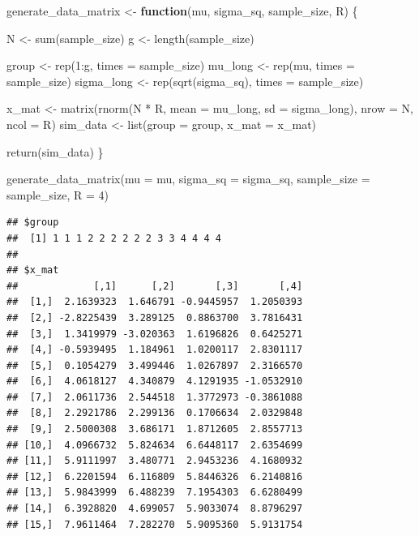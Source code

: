 \documentclass[
]{book}
\newenvironment{Shaded}{\begin{snugshade}}{\end{snugshade}}
\newcommand{\AttributeTok}[1]{\textcolor[rgb]{0.77,0.63,0.00}{#1}}
\newcommand{\ControlFlowTok}[1]{\textcolor[rgb]{0.13,0.29,0.53}{\textbf{#1}}}
\newcommand{\DecValTok}[1]{\textcolor[rgb]{0.00,0.00,0.81}{#1}}
\newcommand{\FunctionTok}[1]{\textcolor[rgb]{0.00,0.00,0.00}{#1}}
\newcommand{\NormalTok}[1]{#1}
\newcommand{\OtherTok}[1]{\textcolor[rgb]{0.56,0.35,0.01}{#1}}
\newcommand{\SpecialCharTok}[1]{\textcolor[rgb]{0.00,0.00,0.00}{#1}}
\begin{document}
\begin{Shaded}
\begin{Highlighting}[]
\NormalTok{generate\_data\_matrix }\OtherTok{\textless{}{-}} \ControlFlowTok{function}\NormalTok{(mu, sigma\_sq, sample\_size, R) \{}

\NormalTok{  N }\OtherTok{\textless{}{-}} \FunctionTok{sum}\NormalTok{(sample\_size) }
\NormalTok{  g }\OtherTok{\textless{}{-}} \FunctionTok{length}\NormalTok{(sample\_size) }
  
\NormalTok{  group }\OtherTok{\textless{}{-}} \FunctionTok{rep}\NormalTok{(}\DecValTok{1}\SpecialCharTok{:}\NormalTok{g, }\AttributeTok{times =}\NormalTok{ sample\_size) }
\NormalTok{  mu\_long }\OtherTok{\textless{}{-}} \FunctionTok{rep}\NormalTok{(mu, }\AttributeTok{times =}\NormalTok{ sample\_size)}
\NormalTok{  sigma\_long }\OtherTok{\textless{}{-}} \FunctionTok{rep}\NormalTok{(}\FunctionTok{sqrt}\NormalTok{(sigma\_sq), }\AttributeTok{times =}\NormalTok{ sample\_size) }

\NormalTok{  x\_mat }\OtherTok{\textless{}{-}} \FunctionTok{matrix}\NormalTok{(}\FunctionTok{rnorm}\NormalTok{(N }\SpecialCharTok{*}\NormalTok{ R, }\AttributeTok{mean =}\NormalTok{ mu\_long, }\AttributeTok{sd =}\NormalTok{ sigma\_long),}
                  \AttributeTok{nrow =}\NormalTok{ N, }\AttributeTok{ncol =}\NormalTok{ R)}
\NormalTok{  sim\_data }\OtherTok{\textless{}{-}} \FunctionTok{list}\NormalTok{(}\AttributeTok{group =}\NormalTok{ group, }\AttributeTok{x\_mat =}\NormalTok{ x\_mat)}
    
  \FunctionTok{return}\NormalTok{(sim\_data)}
\NormalTok{\}}

\FunctionTok{generate\_data\_matrix}\NormalTok{(}\AttributeTok{mu =}\NormalTok{ mu, }\AttributeTok{sigma\_sq =}\NormalTok{ sigma\_sq,}
                     \AttributeTok{sample\_size =}\NormalTok{ sample\_size, }\AttributeTok{R =} \DecValTok{4}\NormalTok{)}
\end{Highlighting}
\end{Shaded}

\begin{verbatim}
## $group
##  [1] 1 1 1 2 2 2 2 2 2 3 3 4 4 4 4
## 
## $x_mat
##             [,1]      [,2]       [,3]       [,4]
##  [1,]  2.1639323  1.646791 -0.9445957  1.2050393
##  [2,] -2.8225439  3.289125  0.8863700  3.7816431
##  [3,]  1.3419979 -3.020363  1.6196826  0.6425271
##  [4,] -0.5939495  1.184961  1.0200117  2.8301117
##  [5,]  0.1054279  3.499446  1.0267897  2.3166570
##  [6,]  4.0618127  4.340879  4.1291935 -1.0532910
##  [7,]  2.0611736  2.544518  1.3772973 -0.3861088
##  [8,]  2.2921786  2.299136  0.1706634  2.0329848
##  [9,]  2.5000308  3.686171  1.8712605  2.8557713
## [10,]  4.0966732  5.824634  6.6448117  2.6354699
## [11,]  5.9111997  3.480771  2.9453236  4.1680932
## [12,]  6.2201594  6.116809  5.8446326  6.2140816
## [13,]  5.9843999  6.488239  7.1954303  6.6280499
## [14,]  6.3928820  4.699057  5.9033074  8.8796297
## [15,]  7.9611464  7.282270  5.9095360  5.9131754
\end{verbatim}
\end{document}
